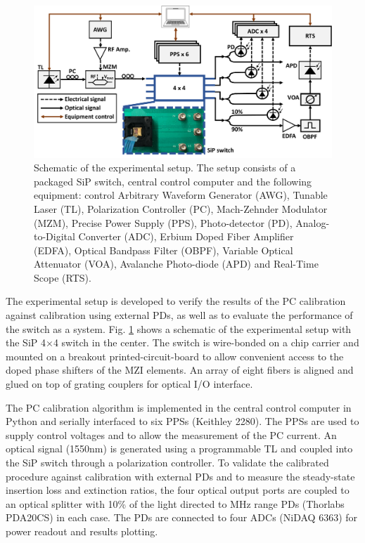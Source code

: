 \begin{figure}[t]
\centering\includegraphics[width=13cm]{Chapter5/fig6_experimental}
\caption{\label{fig:setup}Schematic of the experimental setup. The setup consists of a packaged SiP switch, central control computer and the following equipment: control Arbitrary Waveform Generator (AWG), Tunable Laser (TL), Polarization Controller (PC), Mach-Zehnder Modulator (MZM), Precise Power Supply (PPS), Photo-detector (PD), Analog-to-Digital Converter (ADC), Erbium Doped Fiber Amplifier (EDFA), Optical Bandpass Filter (OBPF), Variable Optical Attenuator (VOA), Avalanche Photo-diode (APD) and Real-Time Scope (RTS).}

\end{figure}





The experimental setup is developed to verify the results of the PC calibration against calibration using external PDs, as well as to evaluate the performance of the switch as a system. Fig. \ref{fig:setup} shows a schematic of the experimental setup with the SiP 4$\times$4 switch in the center. The switch is wire-bonded on a chip carrier and mounted on a breakout printed-circuit-board to allow convenient access to the doped phase shifters of the MZI elements. An array of eight fibers is aligned and glued on top of grating couplers for optical I/O interface. 

The PC calibration algorithm is implemented in the central control computer in Python and serially interfaced to six PPSs (Keithley 2280). The PPSs are used to supply control voltages and to allow the measurement of the PC current. An optical signal (1550nm) is generated using a programmable TL and coupled into the SiP switch through a polarization controller. To validate the calibrated procedure against calibration with external PDs and to measure the steady-state insertion loss and extinction ratios, the four optical output ports are coupled to an optical splitter with 10\% of the light directed to MHz range PDs (Thorlabs PDA20CS) in each case. The PDs are connected to four ADCs (NiDAQ 6363) for power readout and results plotting.

